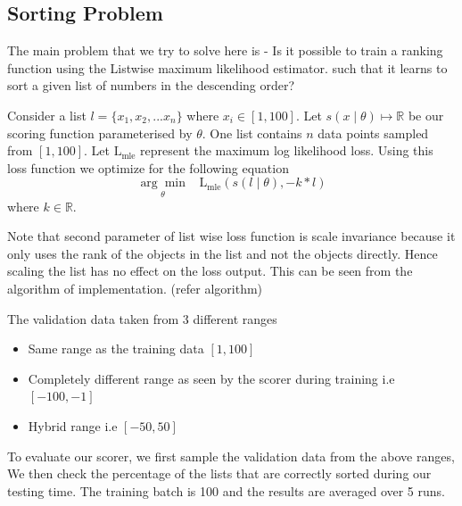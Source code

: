 \documentclass[11pt]{report}
\begin{document}
\subsection{Sorting Problem}
    
The main problem that we try to solve here is - Is it possible to train a ranking function using the Listwise maximum likelihood estimator. 
such that it learns to sort a given list of numbers in the descending order?


Consider a list $l = \{x_1, x_2, ...x_n\}$ where $x_i \in [1, 100]$.
Let $s(x \mid \theta) \mapsto \mathbb{R}$ be our scoring function parameterised by $\theta$.
One list contains $n$ data points sampled from $[1, 100]$.
Let $\textrm{L}_{\textrm{mle}}$ represent the maximum log likelihood loss.
Using this loss function we optimize for the following equation
\begin{equation}
\underset{\theta}{\arg\min} \;\;\; \textrm{L}_{\textrm{mle}}(s(l \mid \theta),  - k * l)
\end{equation}
where $k \in \mathbb{R}$.
 
Note that second parameter of list wise loss function is scale invariance because it only uses the rank of the 
objects in the list and not the objects directly.
Hence scaling the list has no effect on the loss output.
This can be seen from the algorithm of implementation.  (refer algorithm)


The validation data taken from 3 different ranges
\begin{itemize}
\item Same range as the training data $[1, 100]$
\item Completely different range as seen by the scorer during training i.e $[-100, -1]$
\item Hybrid range i.e $[-50, 50]$
\end{itemize} 

To evaluate our scorer,  we first sample the validation data from the above ranges,
We then check the percentage of the lists that are correctly sorted during our testing time.
The training batch is 100 and the results are averaged over 5 runs.
\end{document}
